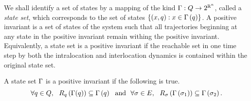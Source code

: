 We shall identify a set of states by a mapping of the kind
$\Gamma:Q\rightarrow 2^{\mathbb{R}^n}$, called a \emph{state
  set}, which corresponds to the set of states
$\left\{\left(x,q\right):x\in\Gamma\left(q\right)\right\}$.  A positive
invariant is a set of states of the system such that all trajectories
beginning at any state in the positive invariant remain withing the
positive invariant.  Equivalently, a state set is a positive invariant
if the reachable set in one time step by both the intralocation and
interlocation dynamics is contained within the original state set.
\begin{definition}
A state set $\Gamma$ is a positive invariant if
the following is true.
\[
 \forall q\in Q,~~R_{q}\left(\Gamma(q)\right) \subseteq \Gamma\left(q\right)~\label{eqn:pi1}~\text{and}~~
 \forall\sigma\in E,~~R_{\sigma}\left(\Gamma\left(\sigma_{1}\right)\right) \subseteq
  \Gamma\left(\sigma_{2}\right).
\]
\end{definition}
